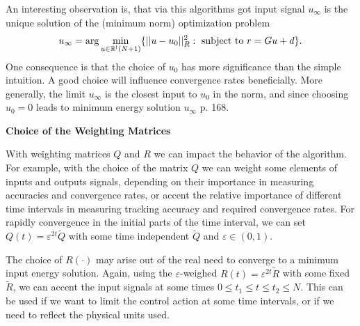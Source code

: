 An interesting observation is, that via this algorithms got input signal $u_\infty$ is the unique solution of the (minimum norm) optimization problem 
\begin{align}
u_\infty = \arg \min_{u \in {\mathbb{R}}^l(N+1)} \{|| u - u_0||_R^2: \text{ subject to } r = Gu + d\}.
\end{align}
One consequence is that the choice of $u_0$ has more significance than the simple intuition. A good choice will influence convergence rates beneficially. More generally, the limit $u_\infty$ is the closest input to $u_0$ in the norm, and since choosing $u_0 = 0$ leads to minimum energy solution $u_\infty$ \cite{ILC} p. 168. 

\textbf{Choice of the Weighting Matrices}

With weighting matrices $Q$ and $R$ we can impact the behavior of the algorithm. For example, with the choice of the matrix $Q$ we can weight some elements of inputs and outputs signals, depending on their importance in measuring accuracies and convergence rates, or accent the relative importance of different time intervals in measuring tracking accuracy and required convergence rates. For rapidly convergence in the initial parts of the time interval, we can set $Q(t) = \varepsilon^{2t}\tilde{Q}$ with some time independent $\tilde{Q}$ and $\varepsilon \in (0,1)$. 

The choice of $R(\cdot)$ may arise out of the real need to converge to a minimum input energy solution. 
Again, using the $\varepsilon$-weighed $R(t) = \varepsilon^{2t}\tilde{R}$ with some fixed $\tilde{R}$, we can accent the input signals at some times $0\leq t_1 \leq t \leq t_2 \leq N$. This can be used if we want to limit the control action at some time intervals, or if we need to reflect the physical units used. 


